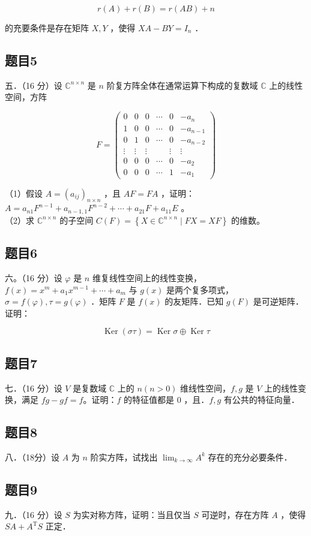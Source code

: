 \documentclass{article}
\begin{document}
\[
r(A)+r(B)=r(A B)+n
\]

的充要条件是存在矩阵 \(X, Y\) ，使得 \(X A-B Y=I_{n}\) ．

\subsection{题目5}
五．（16 分）设 \(\mathbb{C}^{n \times n}\) 是 \(n\) 阶复方阵全体在通常运算下构成的复数域 \(\mathbb{C}\) 上的线性空间，方阵

\[
F=\left(\begin{array}{cccccc}
0 & 0 & 0 & \cdots & 0 & -a_{n} \\
1 & 0 & 0 & \cdots & 0 & -a_{n-1} \\
0 & 1 & 0 & \cdots & 0 & -a_{n-2} \\
\vdots & \vdots & \vdots & & \vdots & \vdots \\
0 & 0 & 0 & \cdots & 0 & -a_{2} \\
0 & 0 & 0 & \cdots & 1 & -a_{1}
\end{array}\right)
\]

（1）假设 \(A=\left(a_{i j}\right)_{n \times n}\) ，且 \(A F=F A\) ，证明：\(A=a_{n 1} F^{n-1}+a_{n-1,1} F^{n-2}+\cdots+a_{21} F+a_{11} E\) 。\\
（2）求 \(\mathbb{C}^{n \times n}\) 的子空间 \(C(F)=\left\{X \in \mathbb{C}^{n \times n} \mid F X=X F\right\}\) 的维数。

\subsection{题目6}
六。（16 分）设 \(\varphi\) 是 \(n\) 维复线性空间上的线性变换，\(f(x)=x^{m}+a_{1} x^{m-1}+\cdots+a_{m}\) 与 \(g(x)\) 是两个复多项式，\(\sigma=f(\varphi), \tau=g(\varphi)\) ．矩阵 \(F\) 是 \(f(x)\) 的友矩阵．已知 \(g(F)\) 是可逆矩阵．证明：

\[
\operatorname{Ker}(\sigma \tau)=\operatorname{Ker} \sigma \oplus \operatorname{Ker} \tau
\]

\subsection{题目7}
七．（16 分）设 \(V\) 是复数域 \(\mathbb{C}\) 上的 \(n(n>0)\) 维线性空间，\(f, g\) 是 \(V\) 上的线性变换，满足 \(f g-g f=f\)。证明：\(f\) 的特征值都是 0 ，且．\(f, g\) 有公共的特征向量．

\subsection{题目8}
八．（18分）设 \(A\) 为 \(n\) 阶实方阵，试找出 \(\lim _{k \rightarrow \infty} A^{k}\) 存在的充分必要条件．

\subsection{题目9}
九．（16 分）设 \(S\) 为实对称方阵，证明：当且仅当 \(S\) 可逆时，存在方阵 \(A\) ，使得 \(S A+A^{\mathrm{T}} S\) 正定．
\end{document}
